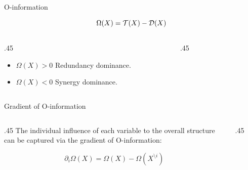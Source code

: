 \documentclass{beamer}
\begin{document}



\begin{frame}{O-information}




\begin{equation*}
  \Omega(X)=\mathcal{T}(X)-\mathcal{D}(X)
\end{equation*}

\begin{columns}
\begin{column}{.45\textwidth}
\begin{itemize}
    \item $\Omega(X)> 0 $ Redundancy dominance.
    \item $\Omega(X)< 0 $ Synergy dominance.
\end{itemize}
\end{column}
\begin{column}{.45\textwidth}

\begin{figure}
    \centering
    
\end{figure}

\end{column}
\end{columns}
\end{frame}



\begin{frame}{Gradient of O-information}
\begin{columns}
\begin{column}{.45\textwidth}
The individual influence of each variable to the overall structure can be captured via the gradient of O-information:

\begin{equation*}
    \partial_i \Omega( X) =  \Omega( X) - \Omega( X^{\setminus i})
\end{equation*}
\end{column}
\begin{column}{.45\textwidth}
\begin{figure}
    \centering
    
\end{figure}

\end{column}
\end{columns}
\end{frame}
\end{document}
